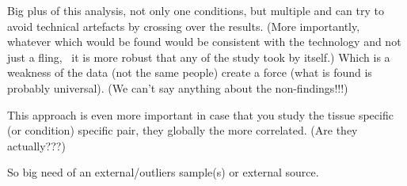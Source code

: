 Big plus of this analysis, not only one conditions, but multiple and can try to
avoid technical artefacts by crossing over the results. (More importantly, whatever
which would be found would be consistent with the technology and not just a fling,
\ie\ it is more robust that any of the study took by itself.)
Which is a weakness of the data (not the same people) create a force (what is found
is probably universal). (We can't say anything about the non-findings!!!)

This approach is even more important in case that you study the tissue specific
(or condition) specific pair, they globally the more correlated. (Are they actually???)

So big need of an external/outliers sample(s) or external source.


\begin{comment}
\TK{Proteome sensé être plus conserver que le RNA : citation}
\end{comment}















